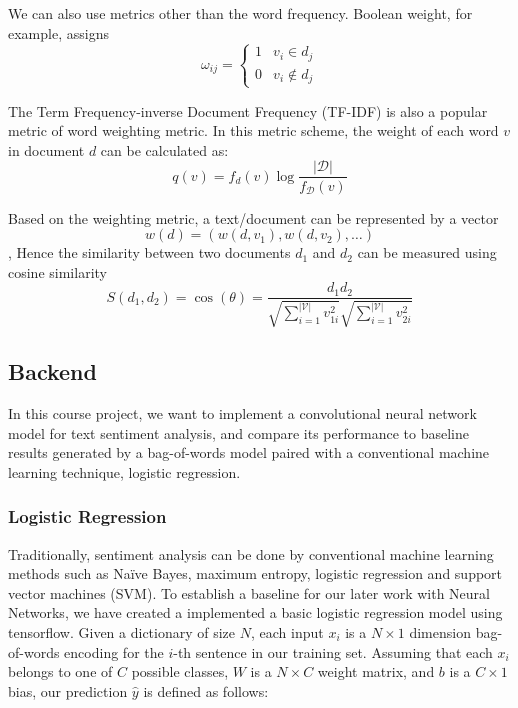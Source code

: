 \documentclass[conference]{IEEEtran}
\begin{document}
    We can also use metrics other than the word frequency. Boolean weight, for example,
    assigns
    $$\omega_{ij} = \begin{cases}
        1 & v_i \in d_j\\
        0 & v_i \notin d_j
    \end{cases}$$

    The Term Frequency-inverse Document Frequency (TF-IDF) is also a popular metric of
    word weighting metric. In this metric scheme, the weight of each word $v$
    in document $d$ can be calculated as:
    $$q(v)=f_d(v)\log\frac{\left|\mathcal{D}\right|}{f_\mathcal{D}(v)}$$

    Based on the weighting metric, a text/document can be represented by a vector
    $$w(d)=(w(d,v_1),w(d,v_2),\ldots)$$,
    Hence the similarity between two documents $d_1$ and $d_2$ can be measured using
    cosine similarity\cite{salton1988term}
    $$S(d_1,d_2)=\cos(\theta)=\frac{d_1d_2}{
    \sqrt{\sum_{i=1}^{\left|\mathcal{V}\right|}{v_{1i}^2}}
    \sqrt{\sum_{i=1}^{\left|\mathcal{V}\right|}{v_{2i}^2}}
    }$$

\subsection{Backend}
\label{model:back}
    In this course project, we want to implement a convolutional neural network
    model for text sentiment analysis, and compare its performance to baseline results
    generated by a bag-of-words model paired with a conventional machine learning
    technique, logistic regression.

\subsubsection{Logistic Regression}
\label{model:back:lr}
    Traditionally, sentiment analysis can be done by conventional machine learning
    methods such as Na\"ive Bayes, maximum entropy, logistic regression and
    support vector machines (SVM).
    To establish a baseline for our later work with Neural Networks, we have
    created a implemented a basic logistic regression model using tensorflow. Given a
    dictionary of size $N$, each input $x_i$ is a $N \times 1$ dimension bag-of-words
    encoding for the $i$-th sentence in our training set. Assuming that each $x_i$
    belongs to one of $C$ possible classes, $W$ is a $N \times C$ weight matrix,
    and $b$ is a $C \times 1$ bias, our prediction $\hat{y}$
    is defined as follows\cite{ng2002discriminative,hosmer2013applied}:
\end{document}
